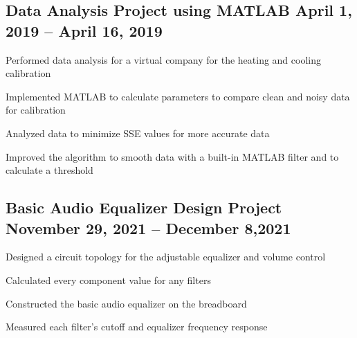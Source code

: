 \documentclass[letter,10pt]{article}
\begin{document}
\subsection{{Data Analysis Project using MATLAB \hfill April 1, 2019 – April 16, 2019}}
\begin{zitemize}
\item Performed data analysis for a virtual company for the heating and cooling calibration
\item Implemented MATLAB to calculate parameters to compare clean and noisy data for calibration
\item Analyzed data to minimize SSE values for more accurate data
\item Improved the algorithm to smooth data with a built-in MATLAB filter and to calculate a threshold
\end{zitemize}

\subsection{{Basic Audio Equalizer Design Project \hfill November 29, 2021 – December 8,2021}}
\begin{zitemize}
\item Designed a circuit topology for the adjustable equalizer and volume control
\item Calculated every component value for any filters
\item Constructed the basic audio equalizer on the breadboard 
\item Measured each filter’s cutoff and equalizer frequency response

\end{zitemize}
\end{document}
